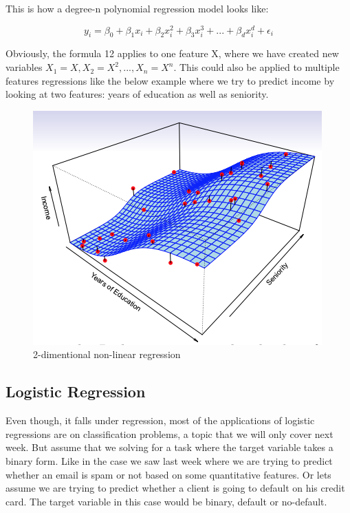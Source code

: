 \documentclass{tufte-handout}
\begin{document}
This is how a degree-n polynomial regression model looks like:

\begin{equation}
    y_i = \beta_0+\beta_1x_i+\beta_2x_i^2+\beta_3x_i^3+...+\beta_d x_i^d+\epsilon_i
\end{equation}

Obviously, the formula 12 applies to one feature X, where we have created new variables \(X_1 =X,     X_2=X^2,..., X_n=X^n\). This could also be applied to multiple features regressions like the below example where we try to predict income by looking at two features: years of education as well as seniority.



 \begin{figure}
  \includegraphics{poly_2.png}
  \caption{2-dimentional non-linear regression}
  \label{fig:textfig}
\end{figure}


\subsection{Logistic Regression}

Even though, it falls under regression, most of the applications of logistic regressions are on classification problems, a topic that we will only cover next week. But assume that we solving for a task where the target variable takes a binary form. Like in the case we saw last week where we are trying to predict whether an email is spam or not based on some quantitative features. Or lets assume we are trying to predict whether a client is going to default on his credit card. The target variable in this case would be binary, default or no-default. 
\end{document}
